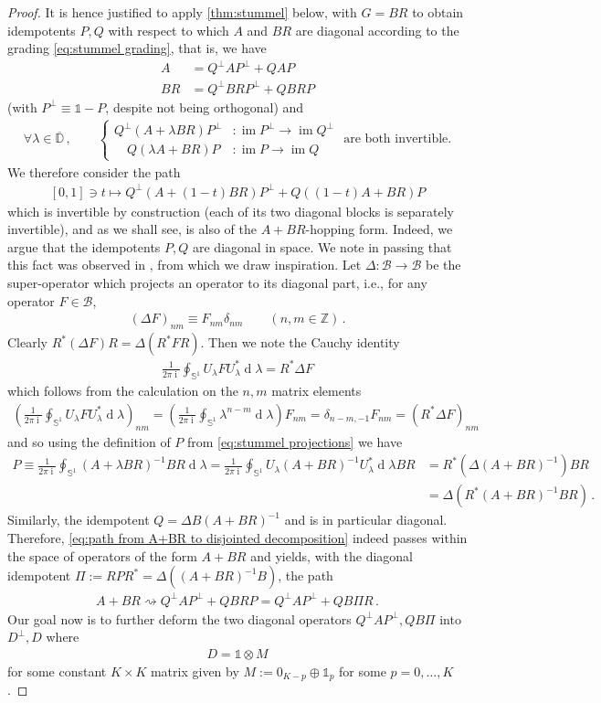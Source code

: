 \documentclass[a4paper,10pt]{article}
\numberwithin{equation}{section}
\theoremstyle{plain}
\theoremstyle{plain}
\theoremstyle{plain}
\theoremstyle{plain}
\theoremstyle{plain}
\theoremstyle{remark}
\theoremstyle{definition}
\theoremstyle{plain}
\newcommand{\ii}{\operatorname{i}}
\newcommand{\ZZ}{\mathbb{Z}}
\newcommand{\bS}{\mathbb{S}}
\newcommand{\calB}{\mathcal{B}}
\newcommand{\bbDelta}{\mathbb{\Delta}}
\newcommand{\dif}{\operatorname{d}}
\newcommand{\Id}{\mathds{1}}
\newcommand{\im}{\operatorname{im}}
\newcommand{\eq}[1]{\begin{align*}#1\end{align*}}
\newcommand{\eql}[1]{\begin{align}#1\end{align}}
\newcommand{\DD}{\mathbb{D}}
\begin{document}
\begin{proof}
		It is hence justified to apply 
		\cref{thm:stummel} below, with $G=BR$ to obtain idempotents $P,Q$ with respect to which $A$ and $BR$ are diagonal according to the grading \cref{eq:stummel grading}, that is, we have \eq{A&=Q^\perp A P^\perp + QAP\\ BR&= Q^\perp BR P^\perp + QBRP} (with $P^\perp\equiv\Id-P$, despite not being orthogonal) and\eql{\label{eq:stummel invertible maps}
			\forall \lambda\in\overline{\DD}\,,\qquad\begin{cases}
				Q^\perp (A+\lambda BR)P^\perp &:\im P^\perp\to\im Q^\perp\\ \quad Q(\lambda A+BR)P&:\im P\to \im Q    
			\end{cases}\text{ are both invertible.}} 
		We therefore consider the path \eql{\label{eq:path from A+BR to disjointed decomposition}[0,1]\ni t\mapsto Q^\perp(A+(1-t)BR)P^\perp + Q((1-t)A+BR)P} which is invertible by construction (each of its two diagonal blocks is separately invertible), and as we shall see, is also of the $A+BR$-hopping form. Indeed, we argue that the idempotents $P,Q$ are diagonal in space. We note in passing that this fact was observed in \cite{ben1991band}, from which we draw inspiration. Let $\bbDelta :\calB\to\calB$ be the super-operator which projects an operator to its diagonal part, i.e., for any operator $F\in\calB$, \eq{(\bbDelta F)_{nm}\equiv F_{nm}\delta_{nm}\qquad(n,m\in\ZZ)\,.} Clearly $R^\ast \left(\bbDelta F\right) R =  \bbDelta \left( R^\ast F R\right) $. Then we note the Cauchy identity \eq{\frac{1}{2\pi \ii}\oint_{\bS^1} U_\lambda FU_\lambda^* \dif{\lambda} = R^\ast\bbDelta F} which follows from the calculation on the $n,m$ matrix elements \eq{\left(\frac{1}{2\pi \ii}\oint_{\bS^1} U_\lambda FU_\lambda^* \dif{\lambda}\right)_{nm}=\left(\frac{1}{2\pi \ii}\oint_{\bS^1} \lambda^{n-m} \dif{\lambda}\right)F_{nm}=\delta_{n-m,-1}F_{nm} = \left(R^\ast \bbDelta F\right)_{nm}} and so using the definition of $P$ from \cref{eq:stummel projections} we have 
		\eq{
			P \equiv \frac{1}{2\pi \ii}\oint_{\bS^1} (A+\lambda BR)^{-1} BR\dif{\lambda} = \frac{1}{2\pi \ii}\oint_{\bS^1} U_\lambda (A+BR)^{-1}U_\lambda^\ast \dif{\lambda} BR &= R^\ast \left(\bbDelta\left(A+BR\right)^{-1} \right)BR \\&= \bbDelta\left(R^\ast \left(A+BR\right)^{-1}BR\right)\,.
		} 
		Similarly, the idempotent $Q= \bbDelta B\left(A+BR\right)^{-1}$ and is in particular diagonal. Therefore, \cref{eq:path from A+BR to disjointed decomposition} indeed passes within the space of operators of the form $A+BR$ and yields, with the diagonal idempotent $\Pi:= R P R^\ast = \bbDelta\left(\left(A+BR\right)^{-1}B\right)$, the path \eq{A+BR\rightsquigarrow Q^\perp AP^\perp + QBRP=Q^\perp AP^\perp + QB\Pi R\,.} Our goal now is to further deform the two diagonal operators $Q^\perp A P^\perp,QB\Pi$ into $D^\perp,D$ where \eql{\label{eq:def of D}D=\Id\otimes M} for some constant $K\times K$ matrix given by $M:=0_{K-p}\oplus\Id_p$ for some $p=0,\dots,K$.
		

\end{proof}
\end{document}
